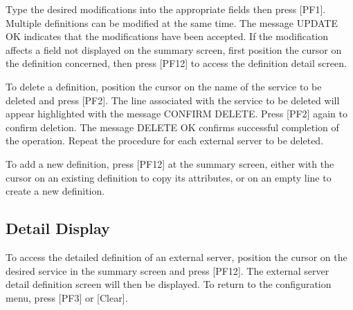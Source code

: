 \documentclass[letterpaper,10pt,english]{sphinxmanual}
\begin{document}
\sphinxAtStartPar
{} \sphinxhyphen{} Type the desired modifications into the appropriate fields then press {[}PF1{]}. Multiple definitions can be modified at the same time. The message UPDATE OK indicates that the modifications have been accepted. If the modification affects a field not displayed on the summary screen, first position the cursor on the definition concerned, then press {[}PF12{]} to access the definition detail screen.

\sphinxAtStartPar
{} \sphinxhyphen{} To delete a definition, position the cursor on the name of the service to be deleted and press {[}PF2{]}. The line associated with the service to be deleted will appear highlighted with the message CONFIRM DELETE. Press {[}PF2{]} again to confirm deletion. The message DELETE OK confirms successful completion of the operation. Repeat the procedure for each external server to be deleted.

\sphinxAtStartPar
{} \sphinxhyphen{} To add a new definition, press {[}PF12{]} at the summary screen, either with the cursor on an existing definition to copy its attributes, or on an empty line to create a new definition.

\ignorespaces 

\subsection{Detail Display}
\label{\detokenize{connectivity_guide:index-133}}\label{\detokenize{connectivity_guide:id70}}
\sphinxAtStartPar
To access the detailed definition of an external server, position the cursor on the desired service in the summary screen and press {[}PF12{]}. The external server detail definition screen will then be displayed. To return to the configuration menu, press {[}PF3{]} or {[}Clear{]}.

\sphinxAtStartPar
{}

\ignorespaces 
\end{document}
